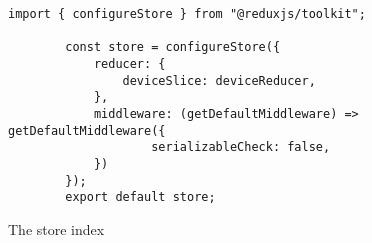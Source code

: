 \begin{figure}[htbp]
    \begin{lstlisting}[language=React]
        import { configureStore } from "@reduxjs/toolkit";

        const store = configureStore({
            reducer: {
                deviceSlice: deviceReducer,
            },
            middleware: (getDefaultMiddleware) => getDefaultMiddleware({
                    serializableCheck: false,
            })
        });
        export default store;
    \end{lstlisting}
    \caption{The store index}
    \label{fig:storeIndex}
\end{figure}